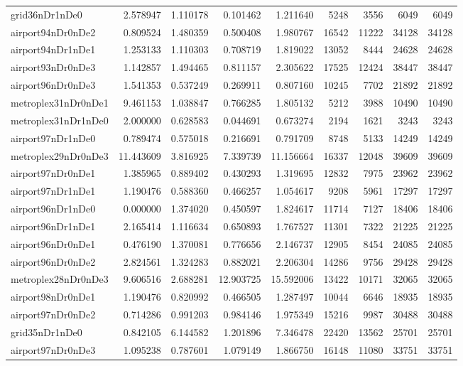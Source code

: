 \begin{longtable}{|l|r|r|r|r|r|r|r|r|}
grid36nDr1nDe0 & 2.578947 & 1.110178 & 0.101462 & 1.211640 & 5248 & 3556 & 6049 & 6049 \\
airport94nDr0nDe2 & 0.809524 & 1.480359 & 0.500408 & 1.980767 & 16542 & 11222 & 34128 & 34128 \\
airport94nDr1nDe1 & 1.253133 & 1.110303 & 0.708719 & 1.819022 & 13052 & 8444 & 24628 & 24628 \\
airport93nDr0nDe3 & 1.142857 & 1.494465 & 0.811157 & 2.305622 & 17525 & 12424 & 38447 & 38447 \\
airport96nDr0nDe3 & 1.541353 & 0.537249 & 0.269911 & 0.807160 & 10245 & 7702 & 21892 & 21892 \\
metroplex31nDr0nDe1 & 9.461153 & 1.038847 & 0.766285 & 1.805132 & 5212 & 3988 & 10490 & 10490 \\
metroplex31nDr1nDe0 & 2.000000 & 0.628583 & 0.044691 & 0.673274 & 2194 & 1621 & 3243 & 3243 \\
airport97nDr1nDe0 & 0.789474 & 0.575018 & 0.216691 & 0.791709 & 8748 & 5133 & 14249 & 14249 \\
metroplex29nDr0nDe3 & 11.443609 & 3.816925 & 7.339739 & 11.156664 & 16337 & 12048 & 39609 & 39609 \\
airport97nDr0nDe1 & 1.385965 & 0.889402 & 0.430293 & 1.319695 & 12832 & 7975 & 23962 & 23962 \\
airport97nDr1nDe1 & 1.190476 & 0.588360 & 0.466257 & 1.054617 & 9208 & 5961 & 17297 & 17297 \\
airport96nDr1nDe0 & 0.000000 & 1.374020 & 0.450597 & 1.824617 & 11714 & 7127 & 18406 & 18406 \\
airport96nDr1nDe1 & 2.165414 & 1.116634 & 0.650893 & 1.767527 & 11301 & 7322 & 21225 & 21225 \\
airport96nDr0nDe1 & 0.476190 & 1.370081 & 0.776656 & 2.146737 & 12905 & 8454 & 24085 & 24085 \\
airport96nDr0nDe2 & 2.824561 & 1.324283 & 0.882021 & 2.206304 & 14286 & 9756 & 29428 & 29428 \\
metroplex28nDr0nDe3 & 9.606516 & 2.688281 & 12.903725 & 15.592006 & 13422 & 10171 & 32065 & 32065 \\
airport98nDr0nDe1 & 1.190476 & 0.820992 & 0.466505 & 1.287497 & 10044 & 6646 & 18935 & 18935 \\
airport97nDr0nDe2 & 0.714286 & 0.991203 & 0.984146 & 1.975349 & 15216 & 9987 & 30488 & 30488 \\
grid35nDr1nDe0 & 0.842105 & 6.144582 & 1.201896 & 7.346478 & 22420 & 13562 & 25701 & 25701 \\
airport97nDr0nDe3 & 1.095238 & 0.787601 & 1.079149 & 1.866750 & 16148 & 11080 & 33751 & 33751 \\

\end{longtable}

